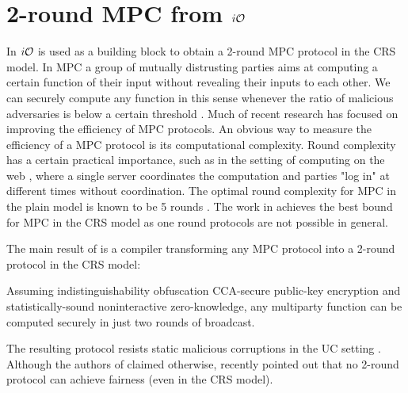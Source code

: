 \section{2-round MPC from $i\mathcal{O}$}

In \cite{MPC-iO} $i\mathcal{O}$ is used as a building block to obtain a 2-round MPC protocol in the CRS model. In MPC a group of mutually distrusting parties aims at computing a certain function of their input without revealing their inputs to each other. We can securely compute any function in this sense whenever the ratio of malicious adversaries is below a certain threshold \cite{}. %
Much of recent research has focused on improving the efficiency of MPC protocols. An obvious way to measure the efficiency of a MPC protocol is its computational complexity. Round complexity has a certain practical importance, such as in the setting of computing on the web \cite{}, %
where a single server coordinates the computation and parties "log in" at different times without coordination.
The optimal round complexity for MPC in the plain model is known to be 5 rounds \cite{katz2004round}. The work in \cite{MPC-iO} achieves the best bound for MPC in the CRS model as one round protocols are not possible in general.

The main result of \cite{MPC-iO} is a compiler transforming any MPC protocol into a 2-round protocol in the CRS model: %
\begin{myinformaltheorem}
	Assuming indistinguishability obfuscation CCA-secure public-key encryption and statistically-sound noninteractive zero-knowledge, any multiparty function can be computed securely in just two rounds of broadcast.
\end{myinformaltheorem}


The resulting protocol resists static malicious corruptions in the UC setting \cite{canetti2001universally}.
Although the authors of \cite{MPC-iO} claimed otherwise, \cite{gordon2015constant} recently pointed out that no 2-round protocol can achieve fairness (even in the CRS model).







\begin{comment}
What to say: (see notepad)
- 
\end{comment}



